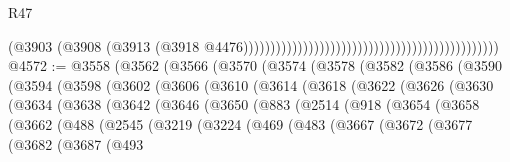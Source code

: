 \begin{lexlean}{R47}
\begin{coremodule}
                                                                                          (@3903
                                                                                            (@3908
                                                                                              (@3913
                                                                                                (@3918
                                                                                                  @4476)))))))))))))))))))))))))))))))))))))))))))))))
@4572 := @3558
    (@3562
      (@3566
        (@3570
          (@3574
            (@3578
              (@3582
                (@3586
                  (@3590
                    (@3594
                      (@3598
                        (@3602
                          (@3606
                            (@3610
                              (@3614
                                (@3618
                                  (@3622
                                    (@3626
                                      (@3630
                                        (@3634
                                          (@3638
                                            (@3642
                                              (@3646
                                                (@3650
                                                  (@883
                                                    (@2514
                                                      (@918
                                                        (@3654
                                                          (@3658
                                                            (@3662
                                                              (@488
                                                                (@2545
                                                                  (@3219
                                                                    (@3224
                                                                      (@469
                                                                        (@483
                                                                          (@3667
                                                                            (@3672
                                                                              (@3677
                                                                                (@3682
                                                                                  (@3687
                                                                                    (@493

\end{coremodule}
\end{lexlean}

